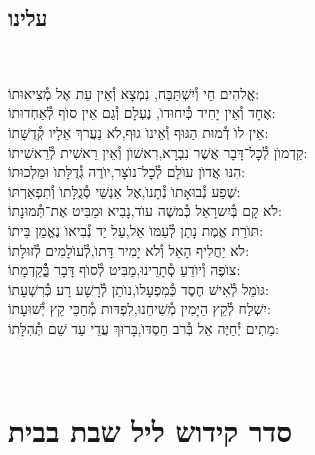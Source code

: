 \documentclass[twoside, openany, parskip=half, 11pt]{book}
\begin{document}
\section*{ עלינו }
\aleinu

\ledavid
\\
\mournerskaddish




אֱלהִים חַי וְ֯יִשְׁתַּבַּח, \hfill נִמְצָא וְ֯אֵין עֵת אֶל מְ֯צִיאוּתוֹ: \\
אֶחָד וְ֯אֵין יָחִיד כְּ֯יִחוּדוׂ, \hfill נֶעְלָם וְ֯גַם אֵין סוׂף לְ֯אַחְדוּתוֹ: \\
אֵין לוׂ דְ֯מוּת הַגּוּף וְ֯אֵינוׂ גוּף,\hfill לׂא נַעֲרךְ אֵלָיו קְ֯דֻשָּׁתוֹ: \\
קַדְמוׂן לְ֯כׇל־דָּבָר אֲשֶׁר נִבְרָא,\hfill רִאשׁוׂן וְ֯אֵין רֵאשִׁית לְ֯רֵאשִׁיתוֹ: \\
הִנּו אֲדוׂן עוׂלָם לְ֯כׇל־נוׂצָר,\hfill יוׂרֶה גְ֯דֻלָּתוׂ וּמַלְכוּתוֹ: \\
שֶׁפַע נְ֯בוּאָתוׂ נְ֯תָנוׂ,\hfill אֶל אַנְשֵׁי סְ֯גֻלָּתוׂ וְ֯תִפְאַרְתּוֹ: \\
לׂא קָם בְּ֯יִשרָאֵל כְּ֯משֶׁה עוׂד,\hfill נָבִיא וּמַבִּיט אֶת־תְּ֯מוּנָתוֹ: \\
תּוׂרַת אֱמֶת נָתַן לְ֯עַמּוׂ אֵל,\hfill עַל יַד נְ֯בִיאוׂ נֶאֱמַן בֵּיתוֹ: \\
לׂא יַחֲלִיף הָאֵל וְ֯לׂא יָמִיר דָּתוׂ,\hfill לְ֯עוׂלָמִים לְ֯זוּלָתוֹ: \\
צוׂפֶה וְ֯יוׂדֵעַ סְ֯תָרֵינוּ,\hfill מַבִּיט לְ֯סוׂף דָּבָר בְְַּ֯֯קַדְמָתוֹ: \\
גּוׂמֵל לְ֯אִישׁ חֶסֶד כְּ֯מִפְעָלוׂ,\hfill נוׂתֵן לְ֯רָשָׁע רַע כְּ֯רִשְׁעָתוֹ: \\
יִשְׁלַח לְ֯קֵץ הַיָּמִין מְ֯שִׁיחֵנוּ,\hfill לִפְדּות מְ֯חַכֵּי קֵץ יְ֯שׁוּעָתוֹ: \\
מֵתִים יְ֯חַיֶּה אֵל בְּ֯רב חַסְדּוׂ,\hfill בָּרוּךְ עֲדֵי עַד שֵׁם תְּ֯הִלָּתוֹ:\\

\vfill

\quad{}\quad{}\\

\chapter[קידוש ליל שבת]{ סדר קידוש ליל שבת בבית }
\end{document}
